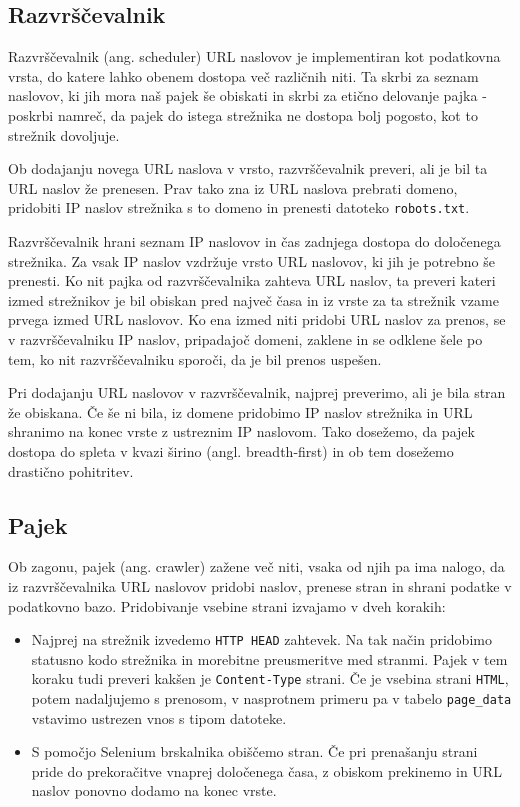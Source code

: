 \documentclass[conference]{IEEEtran}
\begin{document}
	\subsection{Razvrščevalnik}

	Razvrščevalnik (ang. scheduler) URL naslovov je implementiran kot podatkovna vrsta, do katere lahko obenem dostopa več različnih niti. Ta skrbi za seznam naslovov, ki jih mora naš pajek še obiskati in skrbi za etično delovanje pajka - poskrbi namreč, da pajek do istega strežnika ne dostopa bolj pogosto, kot to strežnik dovoljuje.
	
	Ob dodajanju novega URL naslova v vrsto, razvrščevalnik preveri, ali je bil ta URL naslov že prenesen. Prav tako zna iz URL naslova prebrati domeno, pridobiti IP naslov strežnika s to domeno in prenesti datoteko \texttt{robots.txt}.
	
	Razvrščevalnik hrani seznam IP naslovov in čas zadnjega dostopa do določenega strežnika. Za vsak IP naslov vzdržuje vrsto URL naslovov, ki jih je potrebno še prenesti. Ko nit pajka od razvrščevalnika zahteva URL naslov, ta preveri kateri izmed strežnikov je bil obiskan pred največ časa in iz vrste za ta strežnik vzame prvega izmed URL naslovov. Ko ena izmed niti pridobi URL naslov za prenos, se v razvrščevalniku IP naslov, pripadajoč domeni, zaklene in se odklene šele po tem, ko nit razvrščevalniku sporoči, da je bil prenos uspešen.
	
	Pri dodajanju URL naslovov v razvrščevalnik, najprej preverimo, ali je bila stran že obiskana. Če še ni bila, iz domene pridobimo IP naslov strežnika in URL shranimo na konec vrste z ustreznim IP naslovom. Tako dosežemo, da pajek dostopa do spleta v kvazi širino (angl. breadth-first) in ob tem dosežemo drastično pohitritev.
	
	\subsection{Pajek}
	
	Ob zagonu, pajek (ang. crawler) zažene več niti, vsaka od njih pa ima nalogo, da iz razvrščevalnika URL naslovov pridobi naslov, prenese stran in shrani podatke v podatkovno bazo. Pridobivanje vsebine strani izvajamo v dveh korakih:
	
	\begin{itemize}
		\item Najprej na strežnik izvedemo \texttt{HTTP HEAD} zahtevek. Na tak način pridobimo statusno kodo strežnika in morebitne preusmeritve med stranmi. Pajek v tem koraku tudi preveri kakšen je \texttt{Content-Type} strani. Če je vsebina strani \texttt{HTML}, potem nadaljujemo s prenosom, v nasprotnem primeru pa v tabelo \texttt{page\_data} vstavimo ustrezen vnos s tipom datoteke.
		\item S pomočjo Selenium brskalnika obiščemo stran. Če pri prenašanju strani pride do prekoračitve vnaprej določenega časa, z obiskom prekinemo in URL naslov ponovno dodamo na konec vrste.
	\end{itemize}
\end{document}
